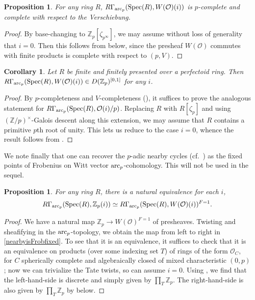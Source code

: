 \documentclass{amsart}
\newtheorem{proposition}[theorem]{Proposition}
\newtheorem{corollary}[theorem]{Corollary}
\theoremstyle{definition}
\newcommand{\spec}{\mathrm{Spec}}
\begin{document}
\begin{proposition} 
\label{Vcompleteness}
For any ring $R$, $R \Gamma_{\arc}( \spec(R), W(\mathcal{O})(i))$ is $p$-complete
and complete with respect to the Verschiebung. 
\end{proposition} 
\begin{proof} 


By base-changing to $\mathbb{Z}_p[\zeta_{p^\infty}]$, we may assume without loss 
of generality that $i = 0$.  
Then this follows from  below, since the presheaf 
$W(\mathcal{O})$ commutes with finite products is complete with respect to $(p, V)$. 
\end{proof} 


\begin{corollary} 
Let $R$ be finite and finitely presented over a perfectoid ring. 
Then $R \Gamma_{\arc}( \spec(R), W(\mathcal{O})(i)) \in D(\mathbb{Z}_p)^{[0,
1]}$ for any $i$. 
\label{cohamplitudeWOi}
\end{corollary} 
\begin{proof} 
By $p$-completeness and $V$-completeness 
(), 
it suffices to prove the analogous statement for 
$R \Gamma_{\arc}( \spec(R), \mathcal{O}(i)/p) $. 
Replacing $R$ with $R[\zeta_p]$ and using $(\mathbb{Z}/p)^{\times}$-Galois
descent along this extension, we may assume that $ R$ contains a primitive $p$th
root of unity. 
This lets us reduce to the case $i = 0$, whence the result follows 
from . 
\end{proof}

We note finally that one can recover the $p$-adic nearby cycles 
(cf.~) as the fixed points of Frobenius 
on Witt vector $\mathrm{arc}_{{p}}$-cohomology. 
This will not be used in the sequel. 

\begin{proposition} 
\label{arcgivesnearbycycles}
For any ring $R$, there is a natural equivalence
for each $i$,
\begin{equation} \label{nearbyisFrobfixed} R \Gamma_{\arc}( \spec(R), \mathbb{Z}_p(i)) \simeq 
R \Gamma_{\arc}( \spec(R), W(\mathcal{O})(i))^{F = 1}.
\end{equation}
\end{proposition} 
\begin{proof} 
We have a natural map $\mathbb{Z}_p \to W(\mathcal{O})^{F=1}$ of presheaves.
Twisting and sheafifying in the $\mathrm{arc}_{{p}}$-topology, we obtain the map from left to
right in 
\eqref{nearbyisFrobfixed}. 
To see that it is an equivalence, it suffices to 
check that it is an equivalence on products (over some indexing set $T$) of 
rings of the form $\mathcal{O}_C$, for $C$ spherically complete and
algebraically closed of mixed characteristic $(0, p)$; now we can trivialize the
Tate twists, so can assume $i = 0$. 
Using , we find that the left-hand-side is discrete
and simply given by $\prod_T \mathbb{Z}_p$. 
The right-hand-side is also given by $\prod_T \mathbb{Z}_p $ by 
 below. 
\end{proof} 
\end{document}
